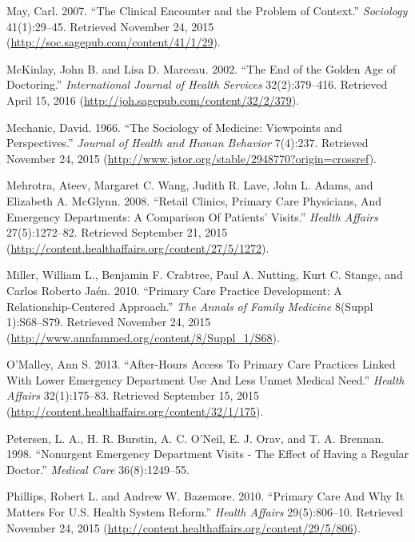 \documentclass[12pt,twoside]{reedthesis}
\begin{document}
  \hypertarget{ref-mayux5fclinicalux5f2007}{}
  May, Carl. 2007. ``The Clinical Encounter and the Problem of Context.''
  \emph{Sociology} 41(1):29--45. Retrieved November 24, 2015
  (\url{http://soc.sagepub.com/content/41/1/29}).
  
  \hypertarget{ref-mckinlayux5fendux5f2002}{}
  McKinlay, John B. and Lisa D. Marceau. 2002. ``The End of the Golden Age
  of Doctoring.'' \emph{International Journal of Health Services}
  32(2):379--416. Retrieved April 15, 2016
  (\url{http://joh.sagepub.com/content/32/2/379}).
  
  \hypertarget{ref-mechanicux5fsociologyux5f1966}{}
  Mechanic, David. 1966. ``The Sociology of Medicine: Viewpoints and
  Perspectives.'' \emph{Journal of Health and Human Behavior} 7(4):237.
  Retrieved November 24, 2015
  (\url{http://www.jstor.org/stable/2948770?origin=crossref}).
  
  \hypertarget{ref-mehrotraux5fretailux5f2008}{}
  Mehrotra, Ateev, Margaret C. Wang, Judith R. Lave, John L. Adams, and
  Elizabeth A. McGlynn. 2008. ``Retail Clinics, Primary Care Physicians,
  And Emergency Departments: A Comparison Of Patients' Visits.''
  \emph{Health Affairs} 27(5):1272--82. Retrieved September 21, 2015
  (\url{http://content.healthaffairs.org/content/27/5/1272}).
  
  \hypertarget{ref-millerux5fprimaryux5f2010}{}
  Miller, William L., Benjamin F. Crabtree, Paul A. Nutting, Kurt C.
  Stange, and Carlos Roberto Jaén. 2010. ``Primary Care Practice
  Development: A Relationship-Centered Approach.'' \emph{The Annals of
  Family Medicine} 8(Suppl 1):S68--S79. Retrieved November 24, 2015
  (\url{http://www.annfammed.org/content/8/Suppl_1/S68}).
  
  \hypertarget{ref-OMALLEYux5f2013}{}
  O'Malley, Ann S. 2013. ``After-Hours Access To Primary Care Practices
  Linked With Lower Emergency Department Use And Less Unmet Medical
  Need.'' \emph{Health Affairs} 32(1):175--83. Retrieved September 15,
  2015 (\url{http://content.healthaffairs.org/content/32/1/175}).
  
  \hypertarget{ref-petersenux5fnonurgentux5f1998}{}
  Petersen, L. A., H. R. Burstin, A. C. O'Neil, E. J. Orav, and T. A.
  Brennan. 1998. ``Nonurgent Emergency Department Visits - The Effect of
  Having a Regular Doctor.'' \emph{Medical Care} 36(8):1249--55.
  
  \hypertarget{ref-phillipsux5fprimaryux5f2010}{}
  Phillips, Robert L. and Andrew W. Bazemore. 2010. ``Primary Care And Why
  It Matters For U.S. Health System Reform.'' \emph{Health Affairs}
  29(5):806--10. Retrieved November 24, 2015
  (\url{http://content.healthaffairs.org/content/29/5/806}).
  
\end{document}
